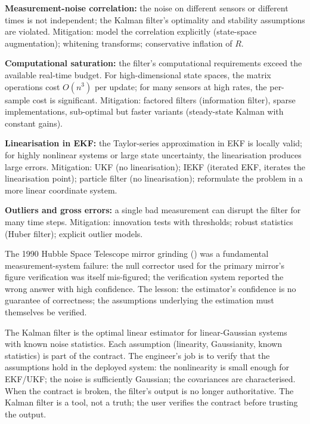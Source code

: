 \textbf{Measurement-noise correlation:} the noise on different sensors or different times is not independent; the Kalman filter's optimality and stability assumptions are violated. Mitigation: model the correlation explicitly (state-space augmentation); whitening transforms; conservative inflation of $R$.

\textbf{Computational saturation:} the filter's computational requirements exceed the available real-time budget. For high-dimensional state spaces, the matrix operations cost $O(n^3)$ per update; for many sensors at high rates, the per-sample cost is significant. Mitigation: factored filters (information filter), sparse implementations, sub-optimal but faster variants (steady-state Kalman with constant gains).

\textbf{Linearisation in EKF:} the Taylor-series approximation in EKF is locally valid; for highly nonlinear systems or large state uncertainty, the linearisation produces large errors. Mitigation: UKF (no linearisation); IEKF (iterated EKF, iterates the linearisation point); particle filter (no linearisation); reformulate the problem in a more linear coordinate system.

\textbf{Outliers and gross errors:} a single bad measurement can disrupt the filter for many time steps. Mitigation: innovation tests with thresholds; robust statistics (Huber filter); explicit outlier models.

The 1990 Hubble Space Telescope mirror grinding (\cite{acc:nasa-hubble-optical-systems-1990}) was a fundamental measurement-system failure: the null corrector used for the primary mirror's figure verification was itself mis-figured; the verification system reported the wrong answer with high confidence. The lesson: the estimator's confidence is no guarantee of correctness; the assumptions underlying the estimation must themselves be verified.

\begin{principle}
The Kalman filter is the optimal linear estimator for linear-Gaussian systems with known noise statistics. Each assumption (linearity, Gaussianity, known statistics) is part of the contract. The engineer's job is to verify that the assumptions hold in the deployed system: the nonlinearity is small enough for EKF/UKF; the noise is sufficiently Gaussian; the covariances are characterised. When the contract is broken, the filter's output is no longer authoritative. The Kalman filter is a tool, not a truth; the user verifies the contract before trusting the output.
\end{principle}

